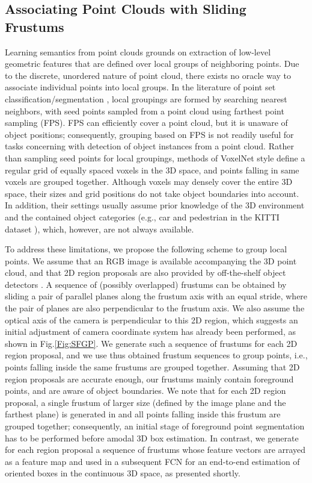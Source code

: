 \documentclass[letterpaper, 10 pt, conference]{ieeeconf}
\begin{document}
\subsection{Associating Point Clouds with Sliding Frustums}

Learning semantics from point clouds grounds on extraction of low-level geometric features that are defined over local groups of neighboring points. Due to the discrete, unordered nature of point cloud, there exists no oracle way to associate individual points into local groups. In the literature of point set classification/segmentation \cite{qi2017pointnet++, li2018pointcnn}, local groupings are formed by searching nearest neighbors, with seed points sampled from a point cloud using farthest point sampling (FPS). FPS can efficiently cover a point cloud, but it is unaware of object positions; consequently, grouping based on FPS is not readily useful for tasks concerning with detection of object instances from a point cloud. Rather than sampling seed points for local groupings, methods of VoxelNet style \cite{zhou2018voxelnet, yan2018second, lang2018pointpillars} define a regular grid of equally spaced voxels in the 3D space, and points falling in same voxels are grouped together. Although voxels may densely cover the entire 3D space, their sizes and grid positions do not take object boundaries into account. In addition, their settings usually assume prior knowledge of the 3D environment and the contained object categories (e.g., car and pedestrian in the KITTI dataset \cite{geiger2012we}), which, however, are not always available.

To address these limitations, we propose the following scheme to group local points. We assume that an RGB image is available accompanying the 3D point cloud, and that 2D region proposals are also provided by off-the-shelf object detectors \cite{girshick2015fast, ren2015faster, liu2016ssd}. A sequence of (possibly overlapped) frustums can be obtained by sliding a pair of parallel planes along the frustum axis with an equal stride, where the pair of planes are also perpendicular to the frustum axis. We also assume the optical axis of the camera is perpendicular to this 2D region, which suggests an initial adjustment of camera coordinate system has already been performed, as shown in Fig.\ref{Fig:SFGP}. We generate such a sequence of frustums for each 2D region proposal, and we use thus obtained frustum sequences to group points, i.e., points falling inside the same frustums are grouped together. Assuming that 2D region proposals are accurate enough, our frustums mainly contain foreground points, and are aware of object boundaries. We note that for each 2D region proposal, a single frustum of larger size (defined by the image plane and the farthest plane) is generated in \cite{qi2018frustum} and all points falling inside this frustum are grouped together; consequently, an initial stage of foreground point segmentation has to be performed before amodal 3D box estimation. In contrast, we generate for each region proposal a sequence of frustums whose feature vectors are arrayed as a feature map and used in a subsequent FCN for an end-to-end estimation of oriented boxes in the continuous 3D space, as presented shortly.
\end{document}
